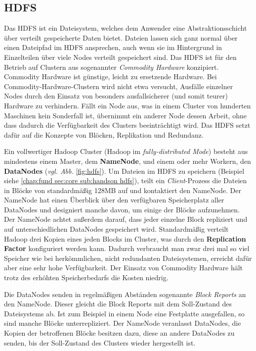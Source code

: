 \subsection{HDFS}
\label{chap:fund sec:core sub:hdfs}
Das HDFS ist ein Dateisystem, welches dem Anwender eine Abstraktionsschicht über verteilt gespeicherte Daten bietet. Dateien lassen sich ganz normal über einen Dateipfad im HDFS ansprechen, auch wenn sie im Hintergrund in Einzelteilen über viele Nodes verteilt gespeichert sind. Das HDFS ist für den Betrieb auf Clustern aus sogenannter \textit{Commodity Hardware} konzipiert. Commodity Hardware ist günstige, leicht zu ersetzende Hardware. Bei Commodity-Hardware-Clustern wird nicht etwa versucht, Ausfälle einzelner Nodes durch den Einsatz von besonders ausfallsicherer (und somit teurer) Hardware zu verhindern. Fällt ein Node aus, was in einem Cluster von hunderten Maschinen kein Sonderfall ist, übernimmt ein anderer Node dessen Arbeit, ohne dass dadurch die Verfügbarkeit des Clusters beeinträchtigt wird. Das HDFS setzt dafür auf die Konzepte von Blöcken, Replikation und Redundanz.\cite{white_hadoop_2015}  
\par
Ein vollwertiger Hadoop Cluster (Hadoop im \textit{fully-distributed Mode}) besteht aus mindestens einem Master, dem \textbf{NameNode}, und einem oder mehr Workern, den \textbf{DataNodes} (\textit{vgl. Abb. }\ref{fig:hdfs}). Um Dateien im HDFS zu speichern (Beispiel siehe \ref{chap:fund sec:core sub:handson hdfs}), teilt ein \textit{Client}-Prozess die Dateien in Blöcke von standardmäßig 128MB auf und kontaktiert den NameNode. Der NameNode hat einen Überblick über den verfügbaren Speicherplatz aller DataNodes und designiert manche davon, um einige der Blöcke aufzunehmen. Der NameNode achtet außerdem darauf, dass jeder einzelne Block repliziert und auf unterschiedlichen DataNodes gespeichert wird. Standardmäßig verteilt Hadoop drei Kopien eines jeden Blocks im Cluster, was durch den \textbf{Replication Factor} konfiguriert werden kann. Dadurch verbraucht man zwar drei mal so viel Speicher wie bei herkömmlichen, nicht redundanten Dateisystemen, erreicht dafür aber eine sehr hohe Verfügbarkeit. Der Einsatz von Commodity Hardware hält trotz des erhöhten Speicherbedarfs die Kosten niedrig.\cite{white_hadoop_2015}     
\par
Die DataNodes senden in regelmäßigen Abständen sogenannte \textit{Block Reports} an den NameNode. Dieser gleicht die Block Reports mit dem Soll-Zustand des Dateisystems ab. Ist zum Beispiel in einem Node eine Festplatte ausgefallen, so sind manche Blöcke unterrepliziert. Der NameNode veranlasst DataNodes, die Kopien der betroffenen Blöcke besitzen dazu, diese an andere DataNodes zu senden, bis der Soll-Zustand des Clusters wieder hergestellt ist.

